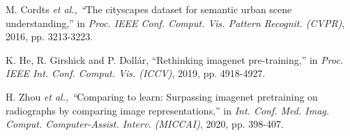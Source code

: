 \documentclass[journal,twoside,web]{ieeecolor}
\begin{document}
\begin{thebibliography}{00}
 M. Cordts \emph{et al., ``}The cityscapes dataset for semantic urban scene understanding,'' in \emph{Proc. IEEE Conf. Comput. Vis. Pattern Recognit. (CVPR)}, 2016, pp. 3213-3223.

 K. He, R. Girshick and P. Doll{\'a}r, ``Rethinking imagenet pre-training,'' in \emph{Proc. IEEE Int. Conf. Comput. Vis. (ICCV)}, 2019, pp. 4918-4927.

 H. Zhou \emph{et al., ``}Comparing to learn: Surpassing imagenet pretraining on radiographs by comparing image representations,'' in \emph{Int. Conf. Med. Imag. Comput. Computer-Assist. Interv. (MICCAI)}, 2020, pp. 398-407.


\end{thebibliography}
\end{document}
